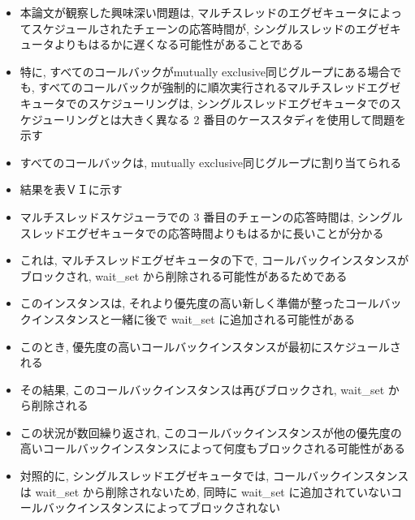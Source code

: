 \begin{frame}{}
    \begin{itemize}
        \item 本論文が観察した興味深い問題は, マルチスレッドのエグゼキュータによってスケジュールされたチェーンの応答時間が, シングルスレッドのエグゼキュータよりもはるかに遅くなる可能性があることである
\item 特に, すべてのコールバックがmutually exclusive同じグループにある場合でも, すべてのコールバックが強制的に順次実行されるマルチスレッドエグゼキュータでのスケジューリングは, シングルスレッドエグゼキュータでのスケジューリングとは大きく異なる 2 番目のケーススタディを使用して問題を示す
\item すべてのコールバックは, mutually exclusive同じグループに割り当てられる
    \end{itemize}
\end{frame}

\begin{frame}{}
    \begin{itemize}
        \item 結果を表ＶＩに示す
\item マルチスレッドスケジューラでの 3 番目のチェーンの応答時間は, シングルスレッドエグゼキュータでの応答時間よりもはるかに長いことが分かる
\item これは, マルチスレッドエグゼキュータの下で, コールバックインスタンスがブロックされ, wait\_set から削除される可能性があるためである
\item このインスタンスは, それより優先度の高い新しく準備が整ったコールバックインスタンスと一緒に後で wait\_set に追加される可能性がある
\item このとき, 優先度の高いコールバックインスタンスが最初にスケジュールされる
\item その結果, このコールバックインスタンスは再びブロックされ, wait\_set から削除される
\item この状況が数回繰り返され, このコールバックインスタンスが他の優先度の高いコールバックインスタンスによって何度もブロックされる可能性がある
\item 対照的に, シングルスレッドエグゼキュータでは, コールバックインスタンスは wait\_set から削除されないため, 同時に wait\_set に追加されていないコールバックインスタンスによってブロックされない
    \end{itemize}
\end{frame}

